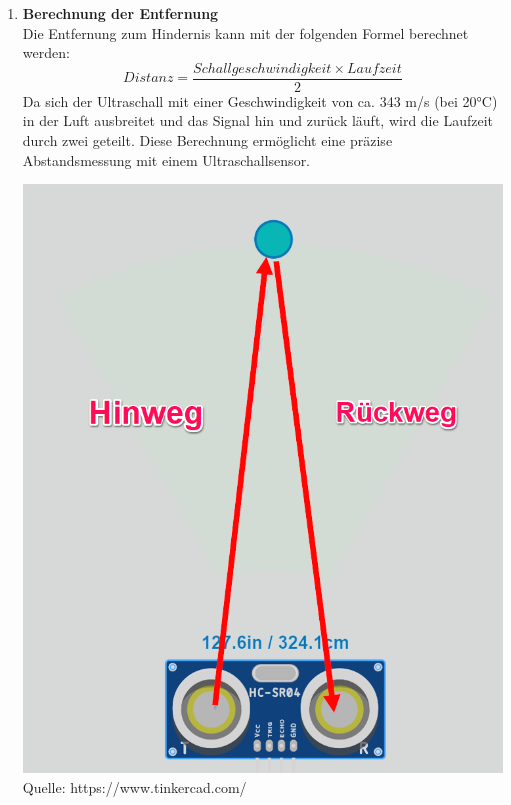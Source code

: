 \documentclass[ngerman,12pt,a4paper]{article}
\begin{document}
\begin{enumerate}
		\item \textbf{Berechnung der Entfernung} \\
		Die Entfernung zum Hindernis kann mit der folgenden Formel berechnet werden:
		\[{Distanz} = \frac{{Schallgeschwindigkeit} \times {Laufzeit}}{2}\]
		Da sich der Ultraschall mit einer Geschwindigkeit von ca. 343 m/s (bei 20°C) in der Luft ausbreitet und das Signal hin und zurück läuft, wird die Laufzeit durch zwei geteilt. Diese Berechnung ermöglicht eine präzise Abstandsmessung mit einem Ultraschallsensor. 
		\begin{center}
			\begin{minipage}{0.5\textwidth}
				\centering
				\includegraphics[width=\textwidth]{Pictures/hcsr04_formel_beispiel}
				\label{fig:hcsr04_formel_beispiel}
				\vspace{5pt}
				{\small Quelle: {https://www.tinkercad.com/}}
			\end{minipage}
		\end{center}
		\end{enumerate}
		
\end{document}
